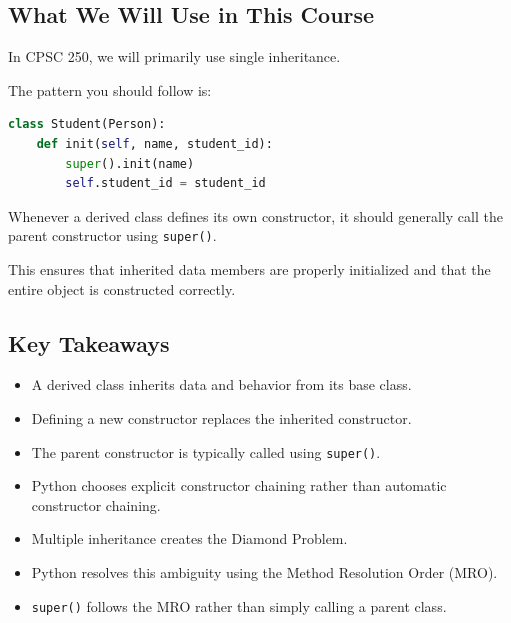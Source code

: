 \documentclass[11pt]{article}
\begin{document}
\subsection{What We Will Use in This Course}

In CPSC 250, we will primarily use single inheritance.

The pattern you should follow is:

\begin{lstlisting}[language=Python]
class Student(Person):
    def init(self, name, student_id):
        super().init(name)
        self.student_id = student_id
\end{lstlisting}

Whenever a derived class defines its own constructor, it should generally call the parent constructor using \texttt{super()}.

This ensures that inherited data members are properly initialized and that the entire object is constructed correctly.

\subsection{Key Takeaways}

\begin{itemize}
\item A derived class inherits data and behavior from its base class.
\item Defining a new constructor replaces the inherited constructor.
\item The parent constructor is typically called using \texttt{super()}.
\item Python chooses explicit constructor chaining rather than automatic constructor chaining.
\item Multiple inheritance creates the Diamond Problem.
\item Python resolves this ambiguity using the Method Resolution Order (MRO).
\item \texttt{super()} follows the MRO rather than simply calling a parent class.
\end{itemize}
\end{document}
